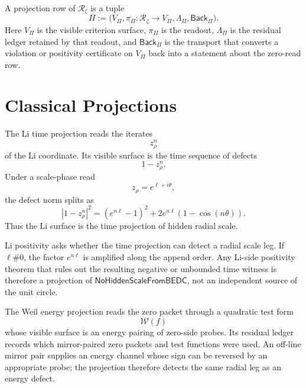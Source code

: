 \begin{definition}
\label{def:rh-circle-triangle-projection-row}
A projection row of $\mathcal R_{\zeta}$ is a tuple
$$
\Pi
:=
\bigl(
V_{\Pi},
\pi_{\Pi}:\mathcal R_{\zeta}\to V_{\Pi},
\Lambda_{\Pi},
\mathsf{Back}_{\Pi}
\bigr).
$$
Here $V_{\Pi}$ is the visible criterion surface, $\pi_{\Pi}$ is the
readout, $\Lambda_{\Pi}$ is the residual ledger retained by that readout,
and $\mathsf{Back}_{\Pi}$ is the transport that converts a violation or
positivity certificate on $V_{\Pi}$ back into a statement about the
zero-read row.
\end{definition}

\section{Classical Projections}
\label{sec:rh-circle-triangle-classical-projections}

\begin{definition}
\label{def:rh-li-time-projection}
The Li time projection reads the iterates
$$
z_{\rho}^n
$$
of the Li coordinate. Its visible surface is the time sequence of
defects
$$
1-z_{\rho}^n.
$$
Under a scale-phase read
$$
z_{\rho}=e^{\ell+i\theta},
$$
the defect norm splits as
$$
|1-z_{\rho}^n|^2
=
(e^{n\ell}-1)^2
+
2e^{n\ell}(1-\cos(n\theta)).
$$
Thus the Li surface is the time projection of hidden radial scale.
\end{definition}

\begin{principle}
\label{prin:rh-li-positivity-time-facing-no-scale-test}
Li positivity asks whether the time projection can detect a radial scale
leg. If $\ell\#0$, the factor $e^{n\ell}$ is amplified along the append
order. Any Li-side positivity theorem that rules out the resulting
negative or unbounded time witness is therefore a projection of
$\mathsf{NoHiddenScaleFromBEDC}$, not an independent source of the unit
circle.
\end{principle}

\begin{definition}
\label{def:rh-weil-energy-projection}
The Weil energy projection reads the zero packet through a quadratic
test form
$$
\mathcal W(f)
$$
whose visible surface is an energy pairing of zero-side probes. Its
residual ledger records which mirror-paired zero packets and test
functions were used. An off-line mirror pair supplies an energy channel
whose sign can be reversed by an appropriate probe; the projection
therefore detects the same radial leg as an energy defect.
\end{definition}

